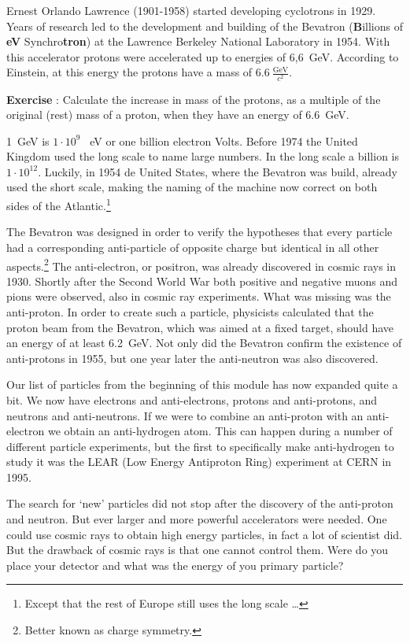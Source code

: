 \documentclass[12pt,a4paper]{article}
\numberwithin{equation}{section}
\numberwithin{figure}{section}
\newcounter{Exercise}
\numberwithin{table}{section}
\begin{document}
Ernest Orlando Lawrence (1901-1958) started developing cyclotrons in 1929. Years of research led to the development and building of the Bevatron (\textbf{B}illions of \textbf{eV} Synchro\textbf{tron}) at the Lawrence Berkeley National Laboratory in 1954. With this accelerator protons were accelerated up to energies of 6,6~GeV. According to Einstein, at this energy the protons have a mass of $6.6~\frac{\mbox{GeV}}{c^2}$.

\begin{shaded}
\textbf{Exercise \theExercise {}} : Calculate the increase in mass of the protons, as a multiple of the original (rest) mass of a proton, when they have an energy of 6.6~GeV.\end{shaded}

1~GeV is $1 \cdot 10^9$~ eV or one billion electron Volts. Before 1974 the United Kingdom used the long scale to name large numbers. In the long scale a billion is $1 \cdot 10^{12}$. Luckily, in 1954 de United States, where the Bevatron was build, already used the short scale, making the naming of the machine now correct on both sides of the Atlantic.\footnote{Except that the rest of Europe still uses the long scale \ldots}

The Bevatron was designed in order to verify the hypotheses that every particle had a corresponding anti-particle of opposite charge but identical in all other aspects.\footnote{Better known as charge symmetry.}  The anti-electron, or positron, was already discovered in cosmic rays in 1930. Shortly after the Second World War both positive and negative muons and pions were observed, also in cosmic ray experiments. What was missing was the anti-proton. In order to create such a particle, physicists calculated that the proton beam from the Bevatron, which was aimed at a fixed target, should have an energy of at least 6.2~GeV. Not only did the Bevatron confirm the existence of anti-protons in 1955, but one year later the anti-neutron was also discovered.

Our list of particles from the beginning of this module has now expanded quite a bit. We now have electrons and anti-electrons, protons and anti-protons, and neutrons and anti-neutrons. If we were to combine an anti-proton with an anti-electron we obtain an anti-hydrogen atom. This can happen during a number of different particle experiments, but the first to specifically make anti-hydrogen to study it was the LEAR (Low Energy Antiproton Ring) experiment at CERN in 1995.

The search for `new' particles did not stop after the discovery of the anti-proton and neutron. But ever larger and more powerful accelerators were needed. One could use cosmic rays to obtain high energy particles, in fact a lot of scientist did. But the drawback of cosmic rays is that one cannot control them. Were do you place your detector and what was the energy of you primary particle?
\end{document}
